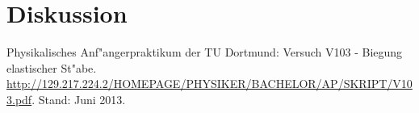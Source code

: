 \section{Diskussion}
	\label{sec:diskussion}


\begin{thebibliography}{9}

	 Physikalisches Anf"angerpraktikum der TU Dortmund: Versuch V103 - Biegung elastischer St"abe. \url{http://129.217.224.2/HOMEPAGE/PHYSIKER/BACHELOR/AP/SKRIPT/V103.pdf}. Stand: Juni 2013.

\end{thebibliography}